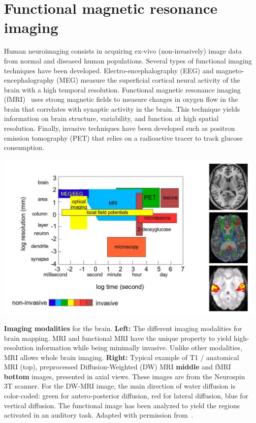 \section{Functional magnetic resonance imaging}
\label{sec:fmri}
Human neuroimaging consists in acquiring ex-vivo
(non-invasively) image data from normal and
diseased human populations.
Several types of functional imaging techniques have been developed. Electro-encephalography (EEG) and magneto-encephalography (MEG) measure the superficial cortical neural activity of the brain with a high temporal resolution. Functional
magnetic resonance imaging (fMRI)~\citep{agawa1990,ogawa1990b} uses strong magnetic fields to measure changes in
oxygen flow in the brain that correlates with synaptic activity in the brain. This technique yields
information on brain structure, variability, and function at high
spatial resolution. Finally, invasive
techniques have been developed such as positron emission tomography (PET) that
relies on a radioactive tracer to track glucose consumption.

\begin{pagefigure}%
  \includegraphics[width=1\linewidth]{figures/modalities.png}
  \caption{\textbf{Imaging modalities} for the brain. \textbf{Left:} The different imaging modalities for brain mapping.
      MRI and functional MRI have
the unique property to yield high-resolution information while being minimally invasive. Unlike other
modalities, MRI allows whole brain imaging. \textbf{Right:} Typical example of T1 / anatomical MRI (top), preprocessed Diffusion-Weighted (DW) MRI \textbf{middle} and fMRI \textbf{bottom} images, presented in axial views.
These images are from the Neurospin 3T scanner. For the DW-MRI image,
the main direction of water diffusion is color-coded: green for antero-posterior diffusion, red for lateral
diffusion, blue for vertical diffusion. The functional image has been analyzed to yield the regions activated
in an auditory task. Adapted with permission from~\citep{thirion_hdr}.}
\end{pagefigure}

